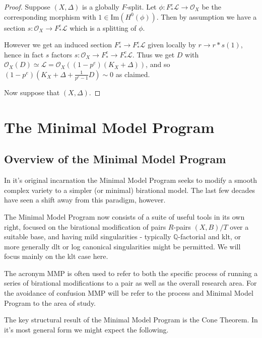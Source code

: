 \documentclass[a4paper,12pt]{book}
\newcommand{\im}{\text{Im}}
\newcommand{\ox}{\mathcal{O}_{X}}
\begin{document}
\begin{proof}
	Suppose $(X,\Delta)$ is a globally $F$-split. Let $\phi:F_{*}^{e}\mathcal{L} \to \ox$ be the corresponding morphism with $1 \in \im(H^{0}(\phi))$. Then by assumption we have a section $s:\ox \to F_{*}^{e}\mathcal{L}$ which is a splitting of $\phi$. 
	
	However we get an induced section $F_{*}^{e} \to F_{*}^{e}\mathcal{L}$ given locally by $r \to r*s(1)$, hence in fact $s$ factors $s: \ox \to F_{*}^{e} \to F_{*}^{e}\mathcal{L}$. Thus we get $D$ with $\ox(D) \simeq \mathcal{L}=\ox((1-p^{e})(K_{X}+\Delta))$, and so $(1-p^{e})(K_{X}+\Delta+\frac{1}{p^{e}-1}D) \sim 0$ as claimed.
	
	Now suppose that $(X,\Delta)$. 
	
	
\end{proof}

\section{The Minimal Model Program}

\subsection{Overview of the Minimal Model Program}\label{overview}
In it's original incarnation the Minimal Model Program seeks to modify a smooth complex variety to a simpler (or minimal) birational model. The last few decades have seen a shift away from this paradigm, however. 

The Minimal Model Program now consists of a suite of useful tools in its own right, focused on the birational modification of pairs $R$-pairs $(X,B)/T$ over a suitable base, and having mild singularities - typically $\mathbb{Q}$-factorial and klt, or more generally dlt or log canonical singularities might be permitted. We will focus mainly on the klt case here.

The acronym MMP is often used to refer to both the specific process of running a series of birational modifications to a pair as well as the overall research area. For the avoidance of confusion MMP will be refer to the process and Minimal Model Program to the area of study.

The key structural result of the Minimal Model Program is the Cone Theorem. In it's most general form we might expect the following.
\end{document}
